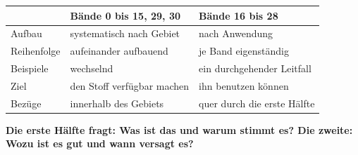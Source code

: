 \begin{merksatz}
\begin{center}
{\small
\renewcommand{\arraystretch}{1.55}
\begin{tabular}{@{}P{2.2cm}P{3.0cm}P{3.2cm}@{}}
\toprule
& \textbf{Bände 0 bis 15, 29, 30} & \textbf{Bände 16 bis 28}\\
\midrule
Aufbau & systematisch nach Gebiet & nach Anwendung\\
Reihenfolge & aufeinander aufbauend & je Band eigenständig\\
Beispiele & wechselnd & \textcolor{akzent}{ein durchgehender Leitfall}\\
Ziel & den Stoff verfügbar machen & ihn benutzen können\\
Bezüge & innerhalb des Gebiets & quer durch die erste Hälfte\\
\bottomrule
\end{tabular}}
\end{center}

\begin{center}
\begin{minipage}{0.9\textwidth}
\textbf{Die erste Hälfte fragt: Was ist das und warum stimmt es? Die zweite: Wozu ist es gut und wann versagt es?}
\end{minipage}
\end{center}
\end{merksatz}

